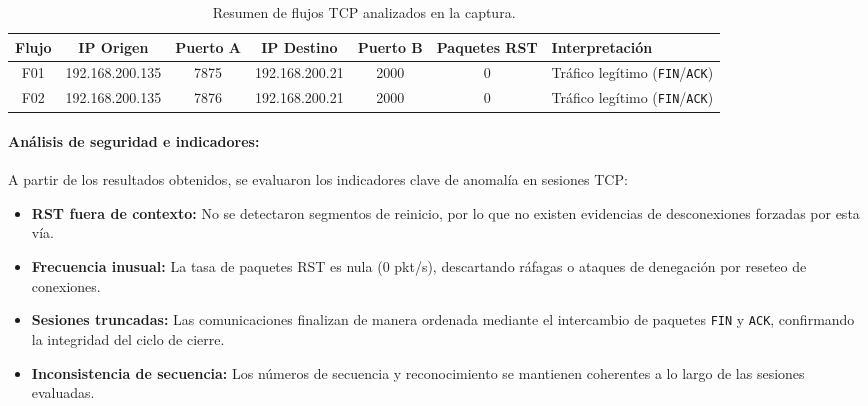 \begin{table}[htbp]
    \centering
    \footnotesize
    \caption{Resumen de flujos TCP analizados en la captura.}
    \label{tab:flujos_rst}
    \begin{tabularx}{\textwidth}{ccccccY} %
        \toprule
        \textbf{Flujo} & \textbf{IP Origen} & \textbf{Puerto A} & \textbf{IP Destino} & \textbf{Puerto B} & \textbf{Paquetes RST} & \textbf{Interpretación} \\
        \midrule
        F01 & 192.168.200.135 & 7875 & 192.168.200.21 & 2000 & 0 & Tráfico legítimo (\texttt{FIN}/\texttt{ACK}) \\
        F02 & 192.168.200.135 & 7876 & 192.168.200.21 & 2000 & 0 & Tráfico legítimo (\texttt{FIN}/\texttt{ACK}) \\
        \bottomrule
    \end{tabularx}
\end{table}

\paragraph{Análisis de seguridad e indicadores:}
A partir de los resultados obtenidos, se evaluaron los indicadores clave de anomalía en sesiones TCP:
\begin{itemize}
    \item \textbf{RST fuera de contexto:} No se detectaron segmentos de reinicio, por lo que no existen evidencias de desconexiones forzadas por esta vía.
    \item \textbf{Frecuencia inusual:} La tasa de paquetes RST es nula ($0$ pkt/s), descartando ráfagas o ataques de denegación por reseteo de conexiones.
    \item \textbf{Sesiones truncadas:} Las comunicaciones finalizan de manera ordenada mediante el intercambio de paquetes \texttt{FIN} y \texttt{ACK}, confirmando la integridad del ciclo de cierre.
    \item \textbf{Inconsistencia de secuencia:} Los números de secuencia y reconocimiento se mantienen coherentes a lo largo de las sesiones evaluadas.
\end{itemize}

